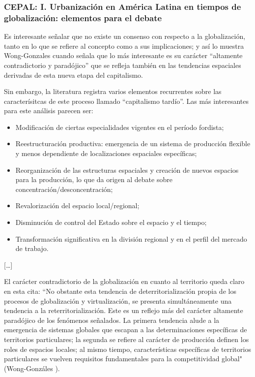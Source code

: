 
\subsubsection*{CEPAL: I. Urbanización en América Latina en tiempos de globalización: elementos para el debate}
  Es interesante señalar que no existe un consenso con respecto a la globalización, tanto en lo que se
  refiere al concepto como a sus implicaciones; y así lo muestra Wong-Gonzales\cite{Won99} cuando señala que lo
  más interesante es su carácter ``altamente contradictorio y paradójico'' que se refleja también en
  las tendencias espaciales derivadas de esta nueva etapa del capitalismo.

  Sin embargo, la literatura registra varios elementos recurrentes sobre las caracterísitcas de este
  proceso llamado ``capitalismo tardío''. Las más interesantes para este análisis parecen ser:
  \begin{itemize}
    \item Modificación de ciertas especialidades vigentes en el período fordista;
    \item Reestructuración productiva: emergencia de un sistema de producción flexible y menos
    dependiente de localizaciones espaciales específicas;
    \item Reorganización de las estructuras espaciales y creación de nuevos espacios para la
    producción, lo que da origen al debate sobre concentración/desconcentración;
    \item Revalorización del espacio local/regional;
    \item Disminución de control del Estado sobre el espacio y el tiempo;
    \item Transformación significativa en la división regional y en el perfil del mercado de trabajo.
  \end{itemize}

  [\ldots]

  El carácter contradictorio de la globalización en cuanto al territorio queda claro en esta cita:
  ``No obstante esta tendencia de deterritorialización propia de los procesos de globalización y
  virtualización, se presenta simultáneamente una tendencia a la reterritorialización. Este es un
  reflejo más del carácter altamente paradójico de los fenómenos señalados. La primera tendencia alude
  a la emergencia de sistemas globales que escapan a las determinaciones específicas de territorios
  particulares; la segunda se refiere al carácter de producción definen los roles de espacios locales;
  al mismo tiempo, características específicas de territorios particulares se vuelven requisitos
  fundamentales para la competitividad global" (Wong-Gonzáles \cite{Won99}).

